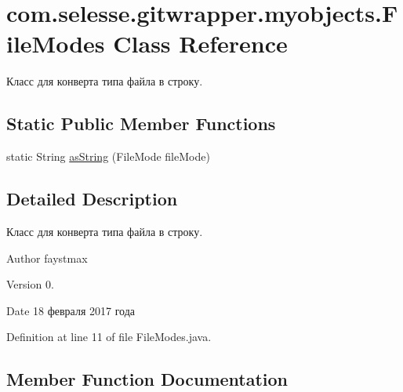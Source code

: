 \hypertarget{classcom_1_1selesse_1_1gitwrapper_1_1myobjects_1_1_file_modes}{}\section{com.\+selesse.\+gitwrapper.\+myobjects.\+File\+Modes Class Reference}
\label{classcom_1_1selesse_1_1gitwrapper_1_1myobjects_1_1_file_modes}


Класс для конверта типа файла в строку.  


\subsection*{Static Public Member Functions}
\begin{DoxyCompactItemize}
\item 
static String \hyperlink{classcom_1_1selesse_1_1gitwrapper_1_1myobjects_1_1_file_modes_a20e78cce80b4aa51eaf76e4f08b90e38}{as\+String} (File\+Mode file\+Mode)
\end{DoxyCompactItemize}


\subsection{Detailed Description}
Класс для конверта типа файла в строку. 

\begin{DoxyAuthor}{Author}
faystmax 
\end{DoxyAuthor}
\begin{DoxyVersion}{Version}
0. 
\end{DoxyVersion}
\begin{DoxyDate}{Date}
18 февраля 2017 года 
\end{DoxyDate}


Definition at line 11 of file File\+Modes.\+java.



\subsection{Member Function Documentation}
\mbox{\label{classcom_1_1selesse_1_1gitwrapper_1_1myobjects_1_1_file_modes_a20e78cce80b4aa51eaf76e4f08b90e38}} 
